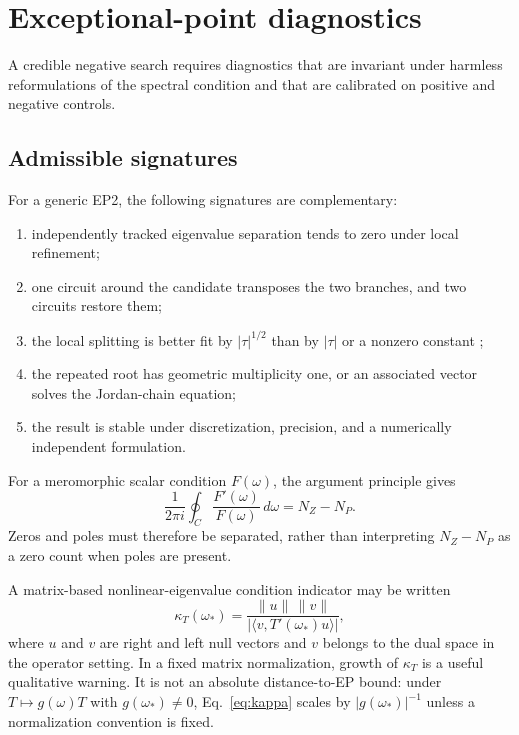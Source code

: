\documentclass[10pt]{article}
\theoremstyle{plain}
\begin{document}
\section{Exceptional-point diagnostics}

A credible negative search requires diagnostics that are invariant under
harmless reformulations of the spectral condition and that are calibrated on
positive and negative controls.

\subsection{Admissible signatures}

For a generic EP2, the following signatures are complementary:
\begin{enumerate}
\item independently tracked eigenvalue separation tends to zero under local
  refinement;
\item one circuit around the candidate transposes the two branches, and two
  circuits restore them;
\item the local splitting is better fit by $|\tau|^{1/2}$ than by $|\tau|$ or a
  nonzero constant \citep{nennig2020};
\item the repeated root has geometric multiplicity one, or an associated vector
  solves the Jordan-chain equation;
\item the result is stable under discretization, precision, and a numerically
  independent formulation.
\end{enumerate}
For a meromorphic scalar condition $F(\omega)$, the argument principle gives
\begin{equation}
\frac{1}{2\pi i}\oint_C\frac{F'(\omega)}{F(\omega)}\,d\omega=N_Z-N_P .
\end{equation}
Zeros and poles must therefore be separated, rather than interpreting
$N_Z-N_P$ as a zero count when poles are present.

A matrix-based nonlinear-eigenvalue condition indicator may be written
\begin{equation}
\kappa_T(\omega_*)=\frac{\|u\|\,\|v\|}{|\langle v,T'(\omega_*)u\rangle|},
\label{eq:kappa}
\end{equation}
where $u$ and $v$ are right and left null vectors and $v$ belongs to the dual
space in the operator setting. In a fixed matrix normalization, growth of
$\kappa_T$ is a useful qualitative warning. It is not an absolute
distance-to-EP bound: under $T\mapsto g(\omega)T$ with $g(\omega_*)\neq0$,
Eq.~\eqref{eq:kappa} scales by $|g(\omega_*)|^{-1}$ unless a normalization
convention is fixed.
\end{document}
